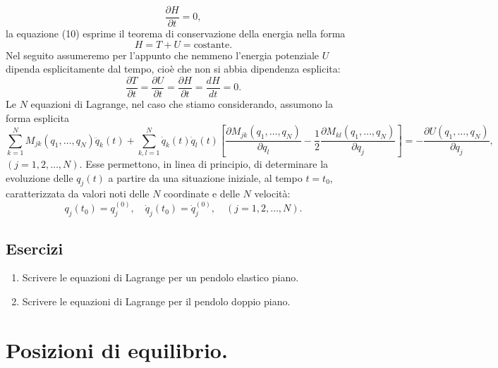 \documentclass[11pt, a4paper]{book}
\numberwithin{equation}{section}
\newenvironment{esercizi}{\subsection*{Esercizi}\begin{enumerate}}{\end{enumerate}}
\begin{document}
\begin{equation}
\frac{\partial H}{\partial t} = 0,
\end{equation}
la equazione (10) esprime il teorema di conservazione della energia nella forma
\begin{equation}
H = T + U = \text{costante}.
\end{equation}
Nel seguito assumeremo per l'appunto che nemmeno l'energia potenziale $U$ dipenda esplicitamente dal tempo, cioè che non si abbia dipendenza esplicita:
\begin{equation}
\frac{\partial T}{\partial t} = \frac{\partial U}{\partial t} = \frac{\partial H}{\partial t} = \frac{dH}{dt} = 0.
\end{equation}
Le $N$ equazioni di Lagrange, nel caso che stiamo considerando, assumono la forma esplicita
\begin{equation}
\sum_{k=1}^{N} M_{jk}(q_1, \dots, q_N) \ddot{q}_k(t) + \sum_{k,l=1}^{N} \dot{q}_k(t) \dot{q}_l(t) \left[ \frac{\partial M_{jk}(q_1, \dots, q_N)}{\partial q_l} - \frac{1}{2} \frac{\partial M_{kl}(q_1, \dots, q_N)}{\partial q_j} \right] = -\frac{\partial U(q_1, \dots, q_N)}{\partial q_j},
\end{equation}
$(j = 1, 2, \dots, N)$. Esse permettono, in linea di principio, di determinare la evoluzione delle $q_j(t)$ a partire da una situazione iniziale, al tempo $t = t_0$, caratterizzata da valori noti delle $N$ coordinate e delle $N$ velocità:
\begin{equation}
q_j(t_0) = q_j^{(0)}, \quad \dot{q}_j(t_0) = \dot{q}_j^{(0)}, \quad (j = 1, 2, \dots, N).
\end{equation}

\begin{esercizi}
\item Scrivere le equazioni di Lagrange per un pendolo elastico piano. %
\item Scrivere le equazioni di Lagrange per il pendolo doppio piano. %
\end{esercizi}

\section{Posizioni di equilibrio.}
\end{document}
